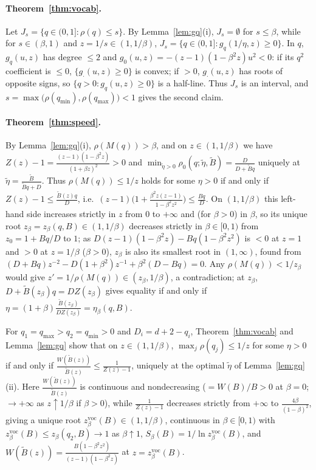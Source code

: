 \documentclass[11pt]{article}
\begin{document}
\paragraph{Theorem~\ref{thm:vocab}.} Let $J_s=\{q\in(0,1]:\rho(q)\le s\}$. By Lemma~\ref{lem:gq}(i), $J_s=\emptyset$ for $s\le\beta$, while for $s\in(\beta,1)$ and $z=1/s\in(1,1/\beta)$, $J_s=\{q\in(0,1]:g_q(1/\eta,z)\ge0\}$. In $q$, $g_q(u,z)$ has degree $\le2$ and $g_0(u,z)=-(z-1)(1-\beta^2z)u^2<0$: if its $q^2$ coefficient is $\le0$, $\{g_\cdot(u,z)\ge0\}$ is convex; if $>0$, $g_\cdot(u,z)$ has roots of opposite signs, so $\{q>0:g_q(u,z)\ge0\}$ is a half-line. Thus $J_s$ is an interval, and $s=\max\big(\rho(q_{\min}),\rho(q_{\max})\big)<1$ gives the second claim.

\paragraph{Theorem~\ref{thm:speed}.} By Lemma~\ref{lem:gq}(i), $\rho(M(q))>\beta$, and on $z\in(1,1/\beta)$ we have $Z(z)-1=\frac{(z-1)(1-\beta^2z)}{(1+\beta z)^2}>0$ and $\min_{\tilde\eta>0}\rho_0(q;\tilde\eta,\tilde B)=\frac{D}{D+\tilde Bq}$ uniquely at $\tilde\eta=\frac{\tilde B}{\tilde Bq+D}$. Thus $\rho(M(q))\le1/z$ holds for some $\eta>0$ if and only if $Z(z)-1\le\frac{\tilde B(z)q}D$, i.e.\ $(z-1)\big(1+\frac{\beta^2z(z-1)}{1-\beta^2z^2}\big)\le\frac{Bq}D$. On $(1,1/\beta)$ this left-hand side increases strictly in $z$ from $0$ to $+\infty$ and (for $\beta>0$) in $\beta$, so its unique root $z_\beta=z_\beta(q,B)\in(1,1/\beta)$ decreases strictly in $\beta\in[0,1)$ from $z_0=1+Bq/D$ to $1$; as $D(z-1)(1-\beta^2z)-Bq(1-\beta^2z^2)$ is $<0$ at $z=1$ and $>0$ at $z=1/\beta$ ($\beta>0$), $z_\beta$ is also its smallest root in $(1,\infty)$, found from $(D+Bq)z^{-2}-D(1+\beta^2)z^{-1}+\beta^2(D-Bq)=0$. Any $\rho(M(q))<1/z_\beta$ would give $z'=1/\rho(M(q))\in(z_\beta,1/\beta)$, a contradiction; at $z_\beta$, $D+\tilde B(z_\beta)q=DZ(z_\beta)$ gives equality if and only if $\eta=(1+\beta)\frac{\tilde B(z_\beta)}{DZ(z_\beta)}=\eta_\beta(q,B)$.

For $q_1=q_{\max}>q_2=q_{\min}>0$ and $D_i=d+2-q_i$, Theorem~\ref{thm:vocab} and Lemma~\ref{lem:gq} show that on $z\in(1,1/\beta)$, $\max_j\rho(q_j)\le1/z$ for some $\eta>0$ if and only if $\frac{W(\tilde B(z))}{\tilde B(z)}\le\frac1{Z(z)-1}$, uniquely at the optimal $\tilde\eta$ of Lemma~\ref{lem:gq}(ii). Here $\frac{W(\tilde B(z))}{\tilde B(z)}$ is continuous and nondecreasing ($=W(B)/B>0$ at $\beta=0$; $\to+\infty$ as $z\uparrow1/\beta$ if $\beta>0$), while $\frac1{Z(z)-1}$ decreases strictly from $+\infty$ to $\frac{4\beta}{(1-\beta)^2}$, giving a unique root $z^{\mathrm{voc}}_\beta(B)\in(1,1/\beta)$, continuous in $\beta\in[0,1)$ with $z^{\mathrm{voc}}_\beta(B)\le z_\beta(q_2,B)\to1$ as $\beta\uparrow1$, $S_\beta(B)=1/\ln z^{\mathrm{voc}}_\beta(B)$, and $W(\tilde B(z))=\frac{B(1-\beta^2z^2)}{(z-1)(1-\beta^2z)}$ at $z=z^{\mathrm{voc}}_\beta(B)$.
\end{document}
